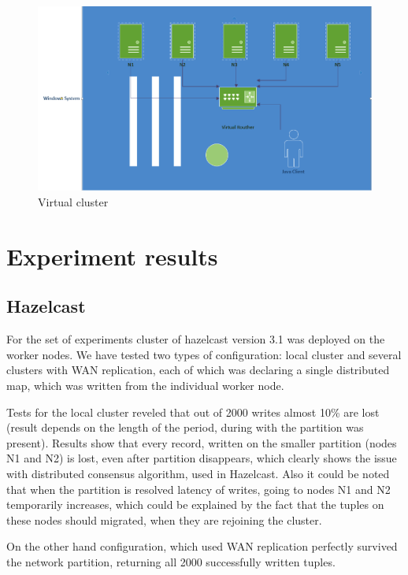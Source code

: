 \documentclass[a4paper]{article}
\begin{document}
\begin{figure}[h!]
	\centering
	\includegraphics[width=\textwidth]{cluster}
	\caption{Virtual cluster}
	\label{fig:cluster}
\end{figure}

\section{Experiment results}

\subsection{Hazelcast}

For the set of experiments cluster of hazelcast version 3.1 was deployed on the worker nodes. 
We have tested two types of configuration: local cluster and several clusters with WAN replication, each of which was declaring a single distributed map, which was written from the individual worker node.

Tests for the local cluster reveled that out of 2000 writes almost 10\% are lost (result depends on the length of the period, during with the partition was present).
Results show that every record, written on the smaller partition (nodes N1 and N2) is lost, even after partition disappears, which clearly shows the issue with distributed consensus algorithm, used in Hazelcast.
Also it could be noted that when the partition is resolved latency of writes, going to nodes N1 and N2 temporarily increases, which could be explained by the fact that the tuples on these nodes should migrated, when they are rejoining the cluster.

On the other hand configuration, which used WAN replication perfectly survived the network partition, returning all 2000 successfully written tuples.
\end{document}
